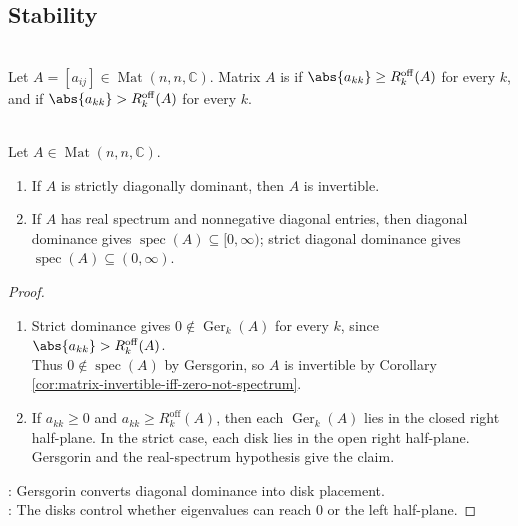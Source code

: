 \subsection{Stability}

\begin{definition} \label{def:diagonal-dominance} \\
Let $A=[a_{ij}]\in\operatorname{Mat}(n,n,\mathbb{C})$. Matrix $A$ is  if $\abs{a_{kk}}\geq R_k^{\mathrm{off}}(A)$ for every $k$, and  if $\abs{a_{kk}}>R_k^{\mathrm{off}}(A)$ for every $k$.
\end{definition}

\begin{corollary} \label{cor:strict-diagonal-dominance-invertible} \\
Let $A\in\operatorname{Mat}(n,n,\mathbb{C})$.
\begin{enumerate}[label=(\roman*)]
\setlength{\itemsep}{0pt}
\item If $A$ is strictly diagonally dominant, then $A$ is invertible.
\item If $A$ has real spectrum and nonnegative diagonal entries, then diagonal dominance gives $\operatorname{spec}(A)\subseteq[0,\infty)$; strict diagonal dominance gives $\operatorname{spec}(A)\subseteq(0,\infty)$.
\end{enumerate}
\begin{proof}
\begin{enumerate}[label=(\roman*)]
\setlength{\itemsep}{0pt}
\item Strict dominance gives $0\notin \operatorname{Ger}_k(A)$ for every $k$, since $\abs{a_{kk}}>R_k^{\mathrm{off}}(A)$.\\
Thus $0\notin\operatorname{spec}(A)$ by Gersgorin, so $A$ is invertible by Corollary \ref{cor:matrix-invertible-iff-zero-not-spectrum}.
\item If $a_{kk}\geq0$ and $a_{kk}\geq R_k^{\mathrm{off}}(A)$, then each $\operatorname{Ger}_k(A)$ lies in the closed right half-plane. In the strict case, each disk lies in the open right half-plane. Gersgorin and the real-spectrum hypothesis give the claim.
\end{enumerate}
: Gersgorin converts diagonal dominance into disk placement.\\
: The disks control whether eigenvalues can reach $0$ or the left half-plane.
\end{proof}
\end{corollary}

